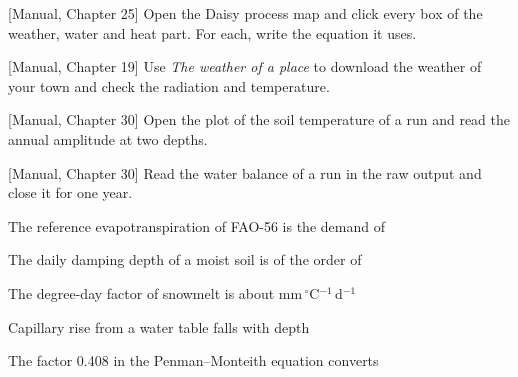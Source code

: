 \begin{exlist}
\item {\color{khblue}[Manual, Chapter 25]} Open the Daisy process map and click every box of the weather, water and heat part. For each, write the equation it uses.\par{}
\item {\color{khblue}[Manual, Chapter 19]} Use \emph{The weather of a place} to download the weather of your town and check the radiation and temperature.\par{}
\item {\color{khblue}[Manual, Chapter 30]} Open the plot of the soil temperature of a run and read the annual amplitude at two depths.\par{}
\item {\color{khblue}[Manual, Chapter 30]} Read the water balance of a run in the raw output and close it for one year.\par{}
\end{exlist}
\begin{exlist}
\item The reference evapotranspiration of FAO-56 is the demand of
\item The daily damping depth of a moist soil is of the order of
\item The degree-day factor of snowmelt is about mm\,$^\circ$C$^{-1}$\,d$^{-1}$
\item Capillary rise from a water table falls with depth
\item The factor 0.408 in the Penman--Monteith equation converts
\end{exlist}
